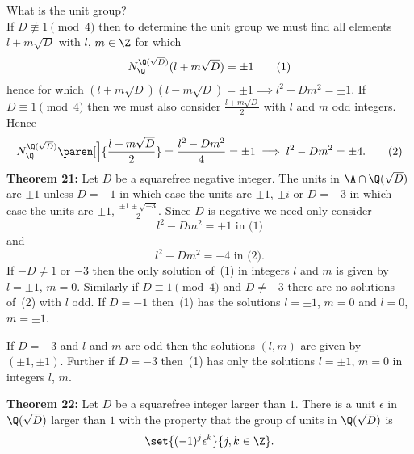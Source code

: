 What is the unit group? \\
If $D\nequiv1\pmod4$ then to determine the unit group we must find all elements $l+m\sqrt{D}$ with $l$, $m\in\Z$ for which
\[ N_\Q^{\Q(\sqrt{D})}(l+m\sqrt{D}) = \pm 1 \tag{1} \]
hence for which $(l+m\sqrt{D})(l-m\sqrt{D})=\pm1\implies l^2-Dm^2=\pm1$.  If $D\equiv1\pmod4$ then we must also consider $\frac{l+m\sqrt{D}}{2}$ with $l$ and $m$ odd integers.  Hence
\[ N_\Q^{\Q(\sqrt{D})}\paren[\Big]{\frac{l+m\sqrt{D}}{2}} = \frac{l^2-Dm^2}{4} = \pm 1 \implies l^2-Dm^2 = \pm4 . \tag{2} \]
\textbf{Theorem 21:} Let $D$ be a squarefree negative integer.  The units in $\A\cap\Q(\sqrt{D})$ are $\pm1$ unless $D=-1$ in which case the units are $\pm1$, $\pm i$ or $D=-3$ in which case the units are $\pm1$, $\frac{\pm1\pm\sqrt{-3}}{2}$.  Since $D$ is negative we need only consider
\[ l^2 - Dm^2 = + 1 \text{ in (1)} \]
and
\[ l^2 - Dm^2 = + 4 \text{ in (2)} . \]
If $-D\neq1$ or $-3$ then the only solution of~(1) in integers $l$ and $m$ is given by $l=\pm1$, $m=0$.  Similarly if $D\equiv1\pmod4$ and $D\neq-3$ there are no solutions of~(2) with $l$ odd.  If $D=-1$ then~(1) has the solutions $l=\pm1$, $m=0$ and $l=0$, $m=\pm1$.

If $D=-3$ and $l$ and $m$ are odd then the solutions $(l,m)$ are given by $(\pm1,\pm1)$.  Further if $D=-3$ then~(1) has only the solutions $l=\pm1$, $m=0$ in integers $l$, $m$.

\textbf{Theorem 22:} Let $D$ be a squarefree integer larger than $1$.  There is a unit $\epsilon$ in $\Q(\sqrt{D})$ larger than $1$ with the property that the group of units in $\Q(\sqrt{D})$ is
\[ \set{(-1)^j\epsilon^k}{j,k\in\Z} . \]